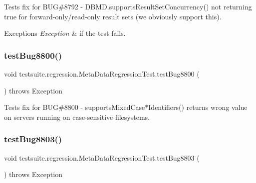 Tests fix for B\+UG\#8792 -\/ D\+B\+M\+D.\+supports\+Result\+Set\+Concurrency() not returning true for forward-\/only/read-\/only result sets (we obviously support this).


\begin{DoxyExceptions}{Exceptions}
{\em Exception} & if the test fails. \\
\hline
\end{DoxyExceptions}
\mbox{\label{classtestsuite_1_1regression_1_1_meta_data_regression_test_a348ef415a6528252b8b3db3a8af6e3d9}} 
\subsubsection{\texorpdfstring{test\+Bug8800()}{testBug8800()}}
{\footnotesize\ttfamily void testsuite.\+regression.\+Meta\+Data\+Regression\+Test.\+test\+Bug8800 (\begin{DoxyParamCaption}{ }\end{DoxyParamCaption}) throws Exception}

Tests fix for B\+UG\#8800 -\/ supports\+Mixed\+Case$\ast$\+Identifiers() returns wrong value on servers running on case-\/sensitive filesystems. \mbox{\label{classtestsuite_1_1regression_1_1_meta_data_regression_test_a2f5b71ea6cea2579da1f5fd73cd93227}} 
\subsubsection{\texorpdfstring{test\+Bug8803()}{testBug8803()}}
{\footnotesize\ttfamily void testsuite.\+regression.\+Meta\+Data\+Regression\+Test.\+test\+Bug8803 (\begin{DoxyParamCaption}{ }\end{DoxyParamCaption}) throws Exception}

